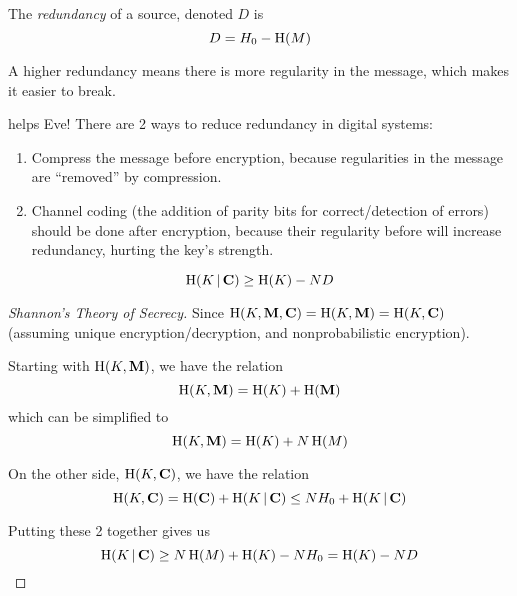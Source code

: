 \begin{definition}[Redundancy]\label{def:Redundancy}
  The \emph{redundancy} of a source, denoted $D$ is
  \begin{equation}\label{eq:Redundancy}
    D = H_{0} - \operatorname{\operatorname{H}}(M)
  \end{equation}

  A higher redundancy means there is more regularity in the message, which makes it easier to break.

  \begin{remark}\label{rmk:Redundancy_Benefits_Eve}
     helps Eve!
    There are 2 ways to reduce redundancy in digital systems:
    \begin{enumerate}[noitemsep]
    \item Compress the message before encryption, because regularities in the message are ``removed'' by compression.
    \item Channel coding (the addition of parity bits for correct/detection of errors) should be done after encryption, because their regularity before will increase redundancy, hurting the key's strength.
    \end{enumerate}
  \end{remark}
\end{definition}

\begin{theorem}\label{thm:Shannon_Theory_of_Secrecy}
  \begin{equation}\label{eq:Shannon_Theory_of_Secrecy}
    \operatorname{\operatorname{H}}(K \operatorname{\vert} \mathbf{C}) \geq \operatorname{\operatorname{H}}(K) - ND
  \end{equation}
\end{theorem}

\begin{proof}[Shannon's Theory of Secrecy]\label{proof:Shannon_Theory_of_Secrecy}
  Since $\operatorname{\operatorname{H}}(K, \mathbf{M}, \mathbf{C}) = \operatorname{\operatorname{H}}(K, \mathbf{M}) = \operatorname{\operatorname{H}}(K, \mathbf{C})$ (assuming unique encryption/decryption, and nonprobabilistic encryption).

  Starting with $\operatorname{\operatorname{H}}(K, \mathbf{M})$, we have the relation
  \begin{equation*}
    \operatorname{\operatorname{H}}(K, \mathbf{M}) = \operatorname{\operatorname{H}}(K) + \operatorname{\operatorname{H}}(\mathbf{M})
  \end{equation*}
  which can be simplified to
  \begin{equation*}
    \operatorname{\operatorname{H}}(K, \mathbf{M}) = \operatorname{\operatorname{H}}(K) + N \operatorname{\operatorname{H}}(M)
  \end{equation*}

  On the other side, $\operatorname{\operatorname{H}}(K, \mathbf{C})$, we have the relation
  \begin{equation*}
    \operatorname{\operatorname{H}}(K, \mathbf{C}) = \operatorname{\operatorname{H}}(\mathbf{C}) + \operatorname{\operatorname{H}}(K \operatorname{\vert} \mathbf{C}) \leq N H_{0} + \operatorname{\operatorname{H}}(K \operatorname{\vert} \mathbf{C})
  \end{equation*}

  Putting these 2 together gives us
  \begin{equation*}
    \operatorname{\operatorname{H}}(K \operatorname{\vert} \mathbf{C}) \geq N \operatorname{\operatorname{H}}(M) + \operatorname{\operatorname{H}}(K) - NH_{0} = \operatorname{\operatorname{H}}(K) - ND
  \end{equation*}
\end{proof}

